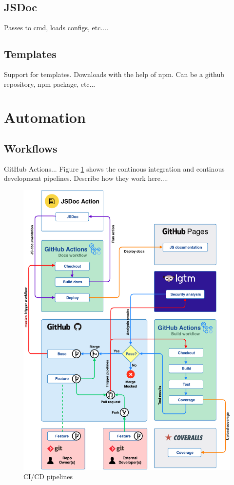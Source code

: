 \subsection{JSDoc}
Passes to cmd, loads configs, etc....

\subsection{Templates}
Support for templates. Downloads with the help of npm. Can be a github repository, npm package, etc...

\section{Automation}
\subsection{Workflows}
GitHub Actions...
Figure \ref{fig:cicd-pipelines} shows the continous integration and continous development pipelines. Describe how they work here....
\begin{figure}[h]
    \setlength{\abovecaptionskip}{25pt}
    \centering
    \includegraphics[page=1,scale=1]{sections/methodology/figures/pipelines.pdf}
    \caption{CI/CD pipelines}
    \label{fig:cicd-pipelines}
\end{figure}
\clearpage

